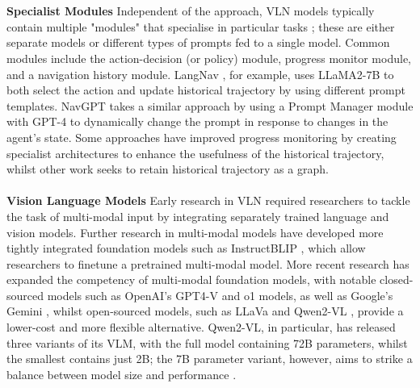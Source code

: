 \documentclass{svproc}
\begin{document}
    \\ \\
    \textbf{Specialist Modules}  Independent of the approach, VLN models typically contain multiple "modules" that specialise in particular tasks \cite{wu2022visionlanguagenavigationsurveytaxonomy}; these are either separate models or different types of prompts fed to a single model. Common modules include the action-decision (or policy) module, progress monitor module, and a navigation history module. LangNav \cite{pan2024langnavlanguageperceptualrepresentation}, for example, uses LLaMA2-7B to both select the action and update historical trajectory by using different prompt templates. NavGPT \cite{zhou2023navgptexplicitreasoningvisionandlanguage} takes a similar approach by using a Prompt Manager module with GPT-4 to dynamically change the prompt in response to changes in the agent's state. Some approaches \cite{chen2021_HAMT, HE2024110511_MemoryAdaptiveVLN} have improved progress monitoring by creating specialist architectures to enhance the usefulness of the historical trajectory, whilst other work \cite{9879544, chen-etal-2024-mapgpt} seeks to retain historical trajectory as a graph.
    \\ \\
    \textbf{Vision Language Models}  Early research in VLN required researchers to tackle the task of multi-modal input by integrating separately trained language and vision models. Further research in multi-modal models have developed more tightly integrated foundation models such as InstructBLIP \cite{dai2023instructblipgeneralpurposevisionlanguagemodels}, which allow researchers to finetune a pretrained multi-modal model. More recent research has expanded the competency of multi-modal foundation models, with notable closed-sourced models such as OpenAI's GPT4-V \cite{openai2024gpt4technicalreport} and o1 \cite{openai_o1} models, as well as Google's Gemini \cite{geminiteam2024geminifamilyhighlycapable}, whilst open-sourced models, such as LLaVa \cite{liu2023visualinstructiontuning} and Qwen2-VL \cite{Qwen2VL}, provide a lower-cost and more flexible alternative. Qwen2-VL, in particular, has released three variants of its VLM, with the full model containing 72B parameters, whilst the smallest contains just 2B; the 7B parameter variant, however, aims to strike a balance between model size and performance \cite{vlm_leaderboard}.
    \\ \\
\end{document}
